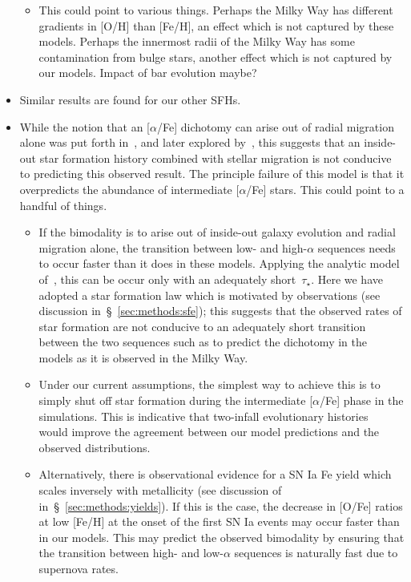 \documentclass[fleqn, usenatbib]{mnras}
\begin{document}
\begin{itemize}
\begin{itemize}
		\item This could point to various things. Perhaps the Milky Way has 
		different gradients in [O/H] than [Fe/H], an effect which is not 
		captured by these models. Perhaps the innermost radii of the Milky 
		Way has some contamination from bulge stars, another effect which is 
		not captured by our models. Impact of bar evolution maybe? 
	\end{itemize} 

	\item Similar results are found for our other SFHs. 

	\item While the notion that an [$\alpha$/Fe] dichotomy can arise out of 
	radial migration alone was put forth in~\citet{Schoenrich2009}, and later 
	explored by~\citet{Nidever2014}, this suggests that an inside-out star 
	formation history combined with stellar migration is not conducive to 
	predicting this observed result. The principle failure of this model is 
	that it overpredicts the abundance of intermediate [$\alpha$/Fe] stars. 
	This could point to a handful of things. 
	\begin{itemize} 
		\item If the bimodality is to arise out of inside-out galaxy 
		evolution and radial migration alone, the transition between low- and 
		high-$\alpha$ sequences needs to occur faster than it does in these 
		models. Applying the analytic model of~\citet{Weinberg2017}, this can 
		be occur only with an adequately short~$\tau_\star$. Here we have 
		adopted a star formation law which is motivated by observations (see 
		discussion in~\S~\ref{sec:methods:sfe}); this suggests that the 
		observed rates of star formation are not conducive to an adequately 
		short transition between the two sequences such as to predict the 
		dichotomy in the models as it is observed in the Milky Way. 

		\item Under our current assumptions, the simplest way to achieve this 
		is to simply shut off star formation during the intermediate 
		[$\alpha$/Fe] phase in the simulations. This is indicative that 
		two-infall evolutionary histories~\citep[e.g.][]{Chiappini1997, 
		Chiappini2001, Romano2010, Grisoni2017, Noguchi2018, Spitoni2016, 
		Spitoni2018, Spitoni2019, Spitoni2020} would improve the 
		agreement between our model predictions and the observed 
		distributions. 

		\item Alternatively, there is observational evidence for a SN Ia Fe 
		yield which scales inversely with metallicity (see discussion of 
		\citealp{Brown2019} in~\S~\ref{sec:methods:yields}). If this is the 
		case, the decrease in [O/Fe] ratios at low [Fe/H] at the onset of 
		the first SN Ia events may occur faster than in our models. This may 
		predict the observed bimodality by ensuring that the transition 
		between high- and low-$\alpha$ sequences is naturally fast due to 
		supernova rates. 
	\end{itemize} 


\end{itemize}
\end{document}
